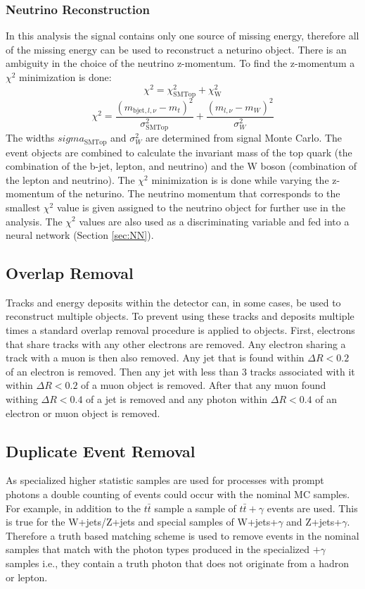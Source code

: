 \subsubsection{Neutrino Reconstruction}
In this analysis the signal contains only one source of missing energy, therefore all of the missing energy can be used to reconstruct a neturino object.  There is an ambiguity in the choice of the neutrino z-momentum.  To find the z-momentum a $\chi^2$ minimization is done:
\[ \chi^2 = \chi_{\text{SMTop}}^2 + \chi_{\text{W}}^2 \]
\[ \chi^2 = \frac{(m_{\text{bjet},l,\nu}-m_t)^2}{\sigma_{\text{SMTop}}^2} + \frac{(m_{l,\nu}-m_W)^2}{\sigma_W^2} \]
The widths $sigma_{\text{SMTop}}$ and $\sigma_W^2$ are determined from signal Monte Carlo.  The event objects are combined to calculate the invariant mass of the top quark (the combination of the b-jet, lepton, and neutrino) and the W boson (combination of the lepton and neutrino).  The $\chi^2$ minimization is is done while varying the z-momentum of the neturino.  The neutrino momentum that corresponds to the smallest $\chi^2$ value is given assigned to the neutrino object for further use in the analysis.  The $\chi^2$ values are also used as a discriminating variable and fed into a neural network (Section \ref{sec:NN}).

\subsection{Overlap Removal}
\label{sec:OverlapRemoval}
Tracks and energy deposits within the detector can, in some cases, be used to reconstruct multiple objects.  To prevent using these tracks and deposits multiple times a standard overlap removal procedure is applied to objects.  First, electrons that share tracks with any other electrons are removed.  Any electron sharing a track with a muon is then also removed.  Any jet that is found within  $\Delta R < 0.2$ of an electron is removed.  Then any jet with less than 3 tracks associated with it within $\Delta R < 0.2$ of a muon object is removed.  After that any muon found withing $\Delta R < 0.4$ of a jet is removed and any photon within $\Delta R < 0.4$ of an electron or muon object is removed. %

\subsection{Duplicate Event Removal}
As specialized higher statistic samples are used for processes with prompt photons a double counting of events could occur with the nominal MC samples.  For example, in addition to the $t\bar{t}$ sample a sample of $t\bar{t}+\gamma$ events are used.  This is true for the W+jets/Z+jets and special samples of W+jets+$\gamma$ and Z+jets+$\gamma$.  Therefore a truth based matching scheme is used to remove events in the nominal samples that match with the photon types produced in the specialized $+\gamma$ samples i.e., they contain a truth photon that does not originate from a hadron or lepton.
